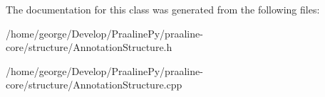 The documentation for this class was generated from the following files\+:\begin{DoxyCompactItemize}
\item 
/home/george/\+Develop/\+Praaline\+Py/praaline-\/core/structure/Annotation\+Structure.\+h\item 
/home/george/\+Develop/\+Praaline\+Py/praaline-\/core/structure/Annotation\+Structure.\+cpp\end{DoxyCompactItemize}
